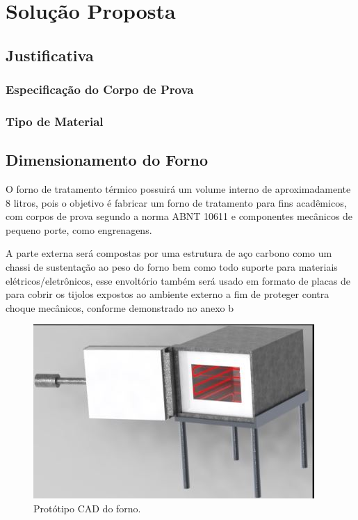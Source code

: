 \chapter[Solução Proposta]{Solução Proposta}

\section{Justificativa}

\subsection{Especificação do Corpo de Prova}

\subsection{Tipo de Material}


\section{Dimensionamento do Forno}

O forno de tratamento térmico possuirá um volume interno de aproximadamente 8 litros, pois o objetivo é fabricar um forno de tratamento para fins acadêmicos, com corpos de prova segundo a norma ABNT 10611 e componentes mecânicos de pequeno porte, como engrenagens.
 
A parte externa será compostas por uma estrutura de aço carbono como um chassi de sustentação ao peso do forno bem como todo suporte para materiais elétricos/eletrônicos, esse envoltório também será usado em formato de placas de para cobrir os tijolos expostos ao ambiente externo a fim de proteger contra choque mecânicos, conforme demonstrado no anexo b

\begin{figure}[h]
	\centering
	\label{cad}
	\includegraphics[keepaspectratio=true,scale=0.8]{figuras/cad.JPG}
	\caption{Protótipo CAD do forno.}
\end{figure}

